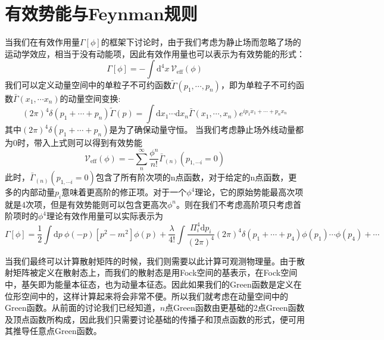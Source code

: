 \section{有效势能与Feynman规则}
当我们在有效作用量$\Gamma[\phi]$的框架下讨论时，由于我们考虑为静止场而忽略了场的运动学效应，相当于没有动能项，因此有效作用量也可以表示为有效势能的形式：
\begin{equation}
    \Gamma[\phi]=-\int\mathrm{d}^4x\,\mathscr{V}_\mathrm{eff}(\phi)\label{eq:veff0}
\end{equation}
我们可以定义动量空间中的单粒子不可约函数$\tilde{\Gamma}(p_1,\cdots,p_n)$，即为单粒子不可约函数$\bar{\Gamma}(x_1,\cdots x_n)$的动量空间变换:
\begin{equation}
(2\pi)^4\delta(p_1+\cdots+p_n)\tilde{\Gamma}(p)=\int\mathrm{d}x_1\cdots\mathrm{d}x_n\bar{\Gamma}(x_1,\cdots,x_n)e^{ip_1x_1+\cdots+p_nx_n}\label{eq:effvert}
\end{equation}
其中$(2\pi)^4\delta(p_1+\cdots+p_n)$是为了确保动量守恒。
当我们考虑静止场外线动量都为0时，带入上式则可以得到有效势能
\begin{equation}
    \mathscr{V}_\mathrm{eff}(\phi) = -\sum_n^\infty \frac{\phi^n}{n!} \bar{\Gamma}_{(n)}(p_{1,\cdots i}=0) \label{eq:effpot}
\end{equation}
此时，$\bar{\Gamma}_{(n)}(p_{1,\cdots i}=0) $包含了所有阶次项的n点函数，对于给定的n点函数，更多的内部动量$p_i$意味着更高阶的修正项。对于一个$\phi^4$理论，它的原始势能最高次项就是4次项，但是有效势能则可以包含更高次$\phi^n$。则在我们不考虑高阶项只考虑首阶项时的$\phi^4$理论有效作用量可以实际表示为
\begin{equation}
    \Gamma[\phi] = \frac{1}{2}\int\mathrm{d}p~\phi(-p)[p^2-m^2]\phi(p) + \frac{\lambda}{4!}\int\frac{\Pi_i^4\mathrm{d}p_i}{(2\pi)^4}(2\pi)^4\delta(p_1+\cdots+p_4)\phi(p_1)\cdots\phi(p_4)+\cdots
\end{equation}

当我们最终可以计算散射矩阵的时候，我们则需要以此计算可观测物理量。由于散射矩阵被定义在散射态上，而我们的散射态是用Fock空间的基表示，在Fock空间中，基矢即为能量本征态，也为动量本征态。因此如果我们的Green函数是定义在位形空间中的，这样计算起来将会非常不便。所以我们就考虑在动量空间中的Green函数。从前面的讨论我们已经知道，$n$点Green函数由更基础的2点Green函数及顶点函数所构成，因此我们只需要讨论基础的传播子和顶点函数的形式，便可用其推导任意点Green函数。



